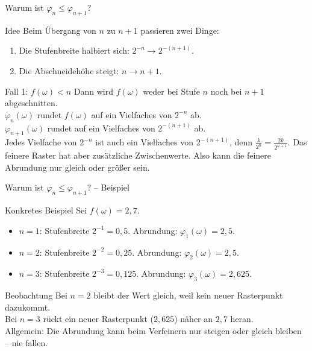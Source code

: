\documentclass{beamer}
\begin{document}
\begin{frame}{Warum ist \(\varphi_n\le\varphi_{n+1}\)?}
\begin{block}{Idee}
Beim Übergang von \(n\) zu \(n+1\) passieren zwei Dinge:
\begin{enumerate}
    \item Die Stufenbreite halbiert sich: \(2^{-n}\to 2^{-(n+1)}\).
    \item Die Abschneidehöhe steigt: \(n\to n+1\).
\end{enumerate}
\end{block}

\begin{block}{Fall 1: \(f(\omega)<n\)}
Dann wird \(f(\omega)\) weder bei Stufe \(n\) noch bei \(n+1\) abgeschnitten.
\\[4pt]
\(\varphi_n(\omega)\) rundet \(f(\omega)\) auf ein Vielfaches von \(2^{-n}\) ab.
\\
\(\varphi_{n+1}(\omega)\) rundet auf ein Vielfaches von \(2^{-(n+1)}\) ab.
\\[4pt]
Jedes Vielfache von \(2^{-n}\) ist auch ein Vielfaches von \(2^{-(n+1)}\), denn \(\tfrac{k}{2^n}=\tfrac{2k}{2^{n+1}}\).
Das feinere Raster hat aber zusätzliche Zwischenwerte. Also kann die feinere Abrundung nur gleich oder größer sein.
\end{block}
\end{frame}

\begin{frame}{Warum ist \(\varphi_n\le\varphi_{n+1}\)? -- Beispiel}
\begin{block}{Konkretes Beispiel}
Sei \(f(\omega)=2{,}7\).
\begin{itemize}
    \item \(n=1\): Stufenbreite \(2^{-1}=0{,}5\). Abrundung: \(\varphi_1(\omega)=2{,}5\).
    \item \(n=2\): Stufenbreite \(2^{-2}=0{,}25\). Abrundung: \(\varphi_2(\omega)=2{,}5\).
    \item \(n=3\): Stufenbreite \(2^{-3}=0{,}125\). Abrundung: \(\varphi_3(\omega)=2{,}625\).
\end{itemize}
\end{block}

\begin{block}{Beobachtung}
Bei \(n=2\) bleibt der Wert gleich, weil kein neuer Rasterpunkt dazukommt.
\\
Bei \(n=3\) rückt ein neuer Rasterpunkt (\(2{,}625\)) näher an \(2{,}7\) heran.
\\[4pt]
Allgemein: Die Abrundung kann beim Verfeinern nur steigen oder gleich bleiben -- nie fallen.
\end{block}
\end{frame}
\end{document}
